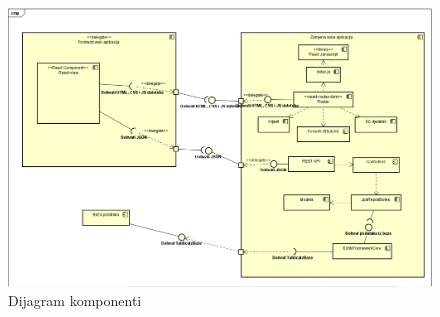 			
			\begin{figure}[H]
				\includegraphics[scale=0.4]{slike/dijagram_komponenti.png} %
				\centering
				\caption{Dijagram komponenti}
				\label{fig:dijagramKomponenti}
			\end{figure}
			
			\eject
			
			
			
			